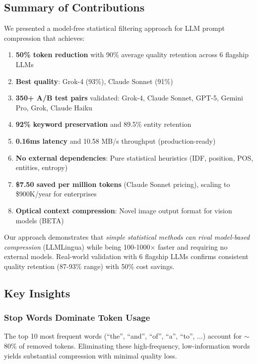 \label{sec:conclusion}

\subsection{Summary of Contributions}

We presented a model-free statistical filtering approach for LLM prompt compression that achieves:

\begin{enumerate}
    \item \textbf{50\% token reduction} with 90\% average quality retention across 6 flagship LLMs
    \item \textbf{Best quality}: Grok-4 (93\%), Claude Sonnet (91\%)
    \item \textbf{350+ A/B test pairs} validated: Grok-4, Claude Sonnet, GPT-5, Gemini Pro, Grok, Claude Haiku
    \item \textbf{92\% keyword preservation} and 89.5\% entity retention
    \item \textbf{0.16ms latency} and 10.58 MB/s throughput (production-ready)
    \item \textbf{No external dependencies}: Pure statistical heuristics (IDF, position, POS, entities, entropy)
    \item \textbf{\$7.50 saved per million tokens} (Claude Sonnet pricing), scaling to \$900K/year for enterprises
    \item \textbf{Optical context compression}: Novel image output format for vision models (BETA)
\end{enumerate}

Our approach demonstrates that \textit{simple statistical methods can rival model-based compression} (LLMLingua) while being 100-1000× faster and requiring no external models. Real-world validation with 6 flagship LLMs confirms consistent quality retention (87-93\% range) with 50\% cost savings.

\subsection{Key Insights}

\subsubsection{Stop Words Dominate Token Usage}

The top 10 most frequent words (``the'', ``and'', ``of'', ``a'', ``to'', ...) account for $\sim$80\% of removed tokens. Eliminating these high-frequency, low-information words yields substantial compression with minimal quality loss.

